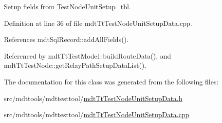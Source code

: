 Setup fields from Test\-Node\-Unit\-Setup\-\_\-tbl. 



Definition at line 36 of file mdt\-Tt\-Test\-Node\-Unit\-Setup\-Data.\-cpp.



References mdt\-Sql\-Record\-::add\-All\-Fields().



Referenced by mdt\-Tt\-Test\-Model\-::build\-Route\-Data(), and mdt\-Tt\-Test\-Node\-::get\-Relay\-Path\-Setup\-Data\-List().



The documentation for this class was generated from the following files\-:\begin{DoxyCompactItemize}
\item 
src/mdttools/mdttesttool/\hyperlink{mdt_tt_test_node_unit_setup_data_8h}{mdt\-Tt\-Test\-Node\-Unit\-Setup\-Data.\-h}\item 
src/mdttools/mdttesttool/\hyperlink{mdt_tt_test_node_unit_setup_data_8cpp}{mdt\-Tt\-Test\-Node\-Unit\-Setup\-Data.\-cpp}\end{DoxyCompactItemize}
